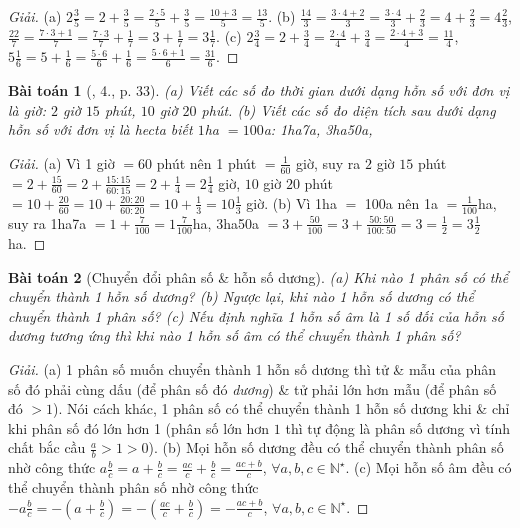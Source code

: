 \documentclass{article}
\newtheorem{baitoan}{Bài toán}
\begin{document}
\begin{proof}[Giải]
	(a) $2\frac{3}{5} = 2 + \frac{3}{5} = \frac{2\cdot5}{5} + \frac{3}{5} = \frac{10 + 3}{5} = \frac{13}{5}$. (b) $\frac{14}{3} = \frac{3\cdot4 + 2}{3} = \frac{3\cdot4}{3} + \frac{2}{3} = 4 + \frac{2}{3} = 4\frac{2}{3}$, $\frac{22}{7} = \frac{7\cdot3 + 1}{7} = \frac{7\cdot3}{7} + \frac{1}{7} = 3 + \frac{1}{7} = 3\frac{1}{7}$. (c) $2\frac{3}{4} = 2 + \frac{3}{4} = \frac{2\cdot4}{4} + \frac{3}{4} = \frac{2\cdot4 + 3}{4} = \frac{11}{4}$, $5\frac{1}{6} = 5 + \frac{1}{6} = \frac{5\cdot6}{6} + \frac{1}{6} = \frac{5\cdot6 + 1}{6} = \frac{31}{6}$.
\end{proof}

\begin{baitoan}[\cite{SGK_Toan_6_Canh_Dieu_tap_2}, 4., p. 33]
	(a) Viết các số đo thời gian dưới dạng hỗn số với đơn vị là giờ: $2$ giờ $15$ phút, $10$ giờ $20$ phút. (b) Viết các số đo diện tích sau dưới dạng hỗn số với đơn vị là hecta biết $1$\emph{ha} $= 100$\emph{a}: \emph{1ha7a, 3ha50a},
\end{baitoan}

\begin{proof}[Giải]
	(a) Vì 1 giờ $= 60$ phút nên 1 phút $= \frac{1}{60}$ giờ, suy ra $2$ giờ $15$ phút $= 2 + \frac{15}{60} = 2 + \frac{15:15}{60:15} = 2 + \frac{1}{4} = 2\frac{1}{4}$ giờ, $10$ giờ $20$ phút $= 10 + \frac{20}{60} = 10 + \frac{20:20}{60:20} = 10 + \frac{1}{3} = 10\frac{1}{3}$ giờ. (b) Vì 1ha $=$ 100a nên 1a $= \frac{1}{100}$ha, suy ra 1ha7a $= 1 + \frac{7}{100} = 1\frac{7}{100}$ha, 3ha50a $= 3 + \frac{50}{100} = 3 + \frac{50:50}{100:50} = 3 = \frac{1}{2} = 3\frac{1}{2}$ha.
\end{proof}

\begin{baitoan}[Chuyển đổi phân số \& hỗn số dương]
	(a) Khi nào 1 phân số có thể chuyển thành 1 hỗn số dương? (b) Ngược lại, khi nào 1 hỗn số dương có thể chuyển thành 1 phân số? (c) Nếu định nghĩa 1 \emph{hỗn số âm} là 1 số đối của hỗn số dương tương ứng thì khi nào 1 hỗn số âm có thể chuyển thành 1 phân số?
\end{baitoan}

\begin{proof}[Giải]
	(a) 1 phân số muốn chuyển thành 1 hỗn số dương thì tử \& mẫu của phân số đó phải cùng dấu (để phân số đó \textit{dương}) \& tử phải lớn hơn mẫu (để phân số đó $> 1$). Nói cách khác, 1 phân số có thể chuyển thành 1 hỗn số dương khi \& chỉ khi phân số đó lớn hơn 1 (phân số lớn hơn $1$ thì tự động là phân số dương vì tính chất bắc cầu $\frac{a}{b} > 1 > 0$). (b) Mọi hỗn số dương đều có thể chuyển thành phân số nhờ công thức $a\frac{b}{c} = a + \frac{b}{c} = \frac{ac}{c} + \frac{b}{c} = \frac{ac + b}{c}$, $\forall a,b,c\in\mathbb{N}^\star$. (c) Mọi hỗn số âm đều có thể chuyển thành phân số nhờ công thức $-a\frac{b}{c} = -\left(a + \frac{b}{c}\right) = -\left(\frac{ac}{c} + \frac{b}{c}\right) = -\frac{ac + b}{c}$, $\forall a,b,c\in\mathbb{N}^\star$.
\end{proof}
\end{document}
